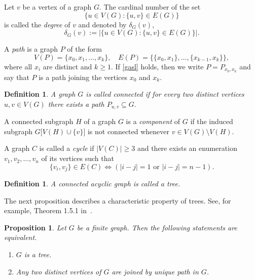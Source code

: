 \documentclass{raex}
\newtheorem{defn}[thm]{Definition}
\newtheorem{prop}[thm]{Proposition}
\theoremstyle{definition}
\theoremstyle{remark}
\numberwithin{equation}{section}
\begin{document}
Let $v$ be a vertex of a graph $G$. The cardinal number of the set
\[
\{u \in V(G) : \{u,v\} \in E(G)\}
\]
is called the {\it degree} of $v$ and denoted by $\delta_G(v)$,
\begin{equation}
    \label{mmks}
\delta_G(v) := \left|\{u \in V(G) : \{u,v\} \in E(G)\}\right|.
\end{equation}


A {\it path} is a graph $P$ of the form
\begin{equation}
    \label{gasl}
V(P)=\{x_0,x_1,\dots,x_k\}, \quad E(P)=\{\{x_0,x_1\},\dots,\{x_{k-1},x_k\}\},
\end{equation}
where all $x_i$ are distinct and $k \geq 1$. If \eqref{gasl} holds, then we write $P=P_{x_0,x_k}$ and say that $P$ is a path joining the vertices $x_0$ and  $x_k$.  



\begin{defn}\label{miy}
A graph $G$ is called {\it connected} if for every two distinct vertices
$u,v\in V(G)$ there exists a path
\(
P_{u,v}\subseteq G.
\)
\end{defn}


A connected subgraph $H$ of a graph $G$ is  a {\it component} of $G$ if the induced subgraph 
\(
G\bigl[V(H)\cup\{v\}\bigr]
\)
is not connected whenever
\(
v\in V(G)\setminus V(H).
\)

A graph $C$ is called a {\it cycle} if $|V(C)|\ge 3$ and there exists an enumeration $v_1,v_2,\dots,v_n$ of its vertices such that
\[
\{v_i,v_j\}\in E(C) \iff (|i-j|=1 \text{ or } |i-j|=n-1).
\]
 


\begin{defn}\label{avct}
    A connected acyclic graph is called a {\it tree}.
\end{defn}


The next proposition describes a characteristic property of trees.
See, for example, Theorem 1.5.1   in~\cite{Diestel2017}.



\begin{prop}\label{hfdsxbj} Let $G$ be a finite  graph. Then the following statements are equivalent.
\begin{enumerate}
\item[(i)] $G$ is a tree.
\item[(ii)] Any two distinct vertices of $G$ are joined by unique path in $G$.
\end{enumerate}
\end{prop}
\end{document}
